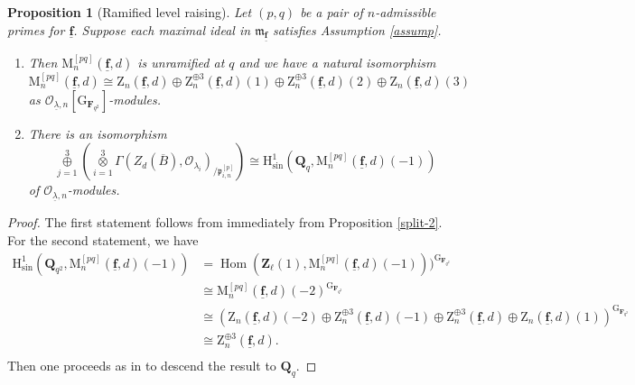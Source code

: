 \documentclass[10pt]{amsart}
\newcommand*\Z{\mathds{Z}}
\newcommand*\ZZ{|[draw,circle]| \Z_2}
\numberwithin{equation}{section}
\theoremstyle{plain}
\newtheorem{proposition}[theorem]{Proposition}
\numberwithin{equation}{section}
\theoremstyle{definition}
\theoremstyle{remark}
\def\sing{\mathrm{sin}}
\def\frakm{\mathfrak{m}}
\def\undlamb{\underline{\lambda}}
\def\triplef{\underline{\mathbf{f}}}
\def\threetensor{\overset{3}{\underset{i=1}\otimes}}
\def\threesum{\overset{3}{\underset{j=1}\oplus} }
\DeclareMathOperator{\Hom}{Hom}
\def\calO{\mathcal{O}}
\def\frakm{\mathfrak{m}}
\def\frakp{\mathfrak{p}}
\def\FF{\mathbf{F}}
\def\QQ{\mathbf{Q}}
\def\ZZ{\mathbf{Z}}
\def\rmG{\mathrm{G}}
\def\rmH{\mathrm{H}}
\def\rmM{\mathrm{M}}
\def\rmZ{\mathrm{Z}}
\begin{document}
\begin{proposition}[Ramified level raising]\label{rami-level-raising}
Let $(p, q)$ be a pair of $n$-admissible primes for $\triplef$. Suppose each maximal ideal in $\frakm_{\triplef}$ satisfies Assumption \ref{assump}. 
\begin{enumerate}
\item Then $\rmM^{[pq]}_{n}(\triplef, d)$ is unramified at $q$ and we have a natural isomorphism
\begin{equation*}
 \rmM^{[pq]}_{n}(\triplef, d)\cong\rmZ_{n}(\triplef, d)\oplus \rmZ^{\oplus 3}_{n}(\triplef, d)(1) \oplus \rmZ^{\oplus 3}_{n}(\triplef, d)(2)\oplus \rmZ_{n}(\triplef, d)(3)
\end{equation*}
as $\calO_{\undlamb,n}[\rmG_{\FF_{q^{2}}}]$-modules. 

\item There is an isomorphism 
\begin{equation*}
\threesum(\threetensor\Gamma(Z_{d}(\overline{B}),\calO_{\lambda_{i}})_{/\frakp^{[p]}_{i, n}})\cong\rmH^{1}_{\sing}(\QQ_{q},  \rmM^{[pq]}_{n}(\triplef, d)(-1))
\end{equation*}
of $\calO_{\underline{\lambda}, n}$-modules.
\end{enumerate}
\end{proposition}
\begin{proof}
The first statement follows from immediately from Proposition \ref{split-2}.  For the second statement, we have
\begin{equation*}
\begin{aligned}
\rmH^{1}_{\sing}(\QQ_{q^{2}},  \rmM^{[pq]}_{n}(\triplef, d)(-1))&=\Hom(\ZZ_{\ell}(1),  \rmM^{[pq]}_{n}(\triplef, d)(-1)))^{\rmG_{\FF_{q^{2}}}}\\
&\cong \rmM^{[pq]}_{n}(\triplef, d)(-2)^{\rmG_{\FF_{q^{2}}}}\\
&\cong (\rmZ_{n}(\triplef,d)(-2)\oplus \rmZ^{\oplus 3}_{n}(\triplef, d)(-1) \oplus \rmZ^{\oplus 3}_{n}(\triplef, d)\oplus \rmZ_{n}(\triplef,d)(1))^{\rmG_{\FF_{q^{2}}}}\\
&\cong \rmZ^{\oplus 3}_{n}(\triplef,d).\\
\end{aligned}
\end{equation*}
Then one proceeds as in  \cite[Corollary 4.11]{Wang} to descend the result to $\QQ_{q}$. 
\end{proof}
\end{document}
